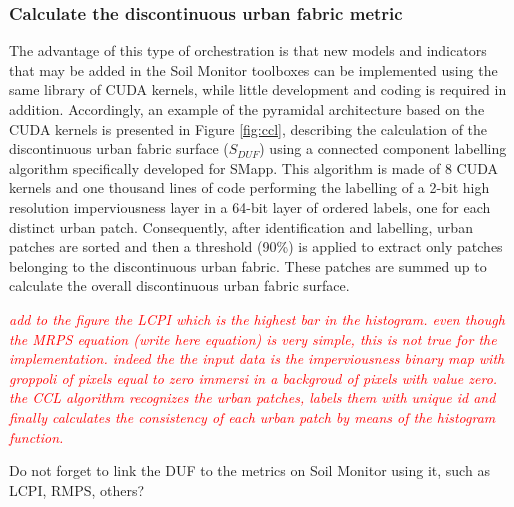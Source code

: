\documentclass[APA,LATO1COL,doublespace]{WileyNJD-v2}
\newcommand{\toberevised}[1]{\emph{\textcolor{red}{#1}}} %
\begin{document}
\subsubsection{Calculate the discontinuous urban fabric metric}
The advantage of this type of orchestration is that new models and indicators that may be added in the Soil Monitor toolboxes can be implemented using the same library of CUDA kernels, while little development and coding is required in addition. 
Accordingly, an example of the pyramidal architecture based on the CUDA kernels is presented in Figure \ref{fig:ccl}, describing the calculation of the discontinuous urban fabric surface ($S_{DUF}$) using a connected component labelling algorithm specifically developed for SMapp. 
This algorithm is made of 8 CUDA kernels and one thousand lines of code performing the labelling of a 2-bit high resolution imperviousness layer in a 64-bit layer of ordered labels, one for each distinct urban patch.
Consequently, after identification and labelling, urban patches are sorted and then a threshold (90\%) is applied to extract only patches belonging to the discontinuous urban fabric. 
These patches are summed up to calculate the overall discontinuous urban fabric surface.


\toberevised{add to the figure the LCPI which is the highest bar in the histogram.
even though the MRPS equation (write here equation) is very simple, this is not true for the implementation.
indeed the the input data is the imperviousness binary map with groppoli of pixels equal to zero immersi in a backgroud of pixels with value zero. the CCL algorithm recognizes the urban patches, labels them with unique id and finally calculates the consistency of each urban patch by means of the histogram function.      }

Do not forget to link the DUF to the metrics on Soil Monitor using it, such as LCPI, RMPS, others?
\end{document}
